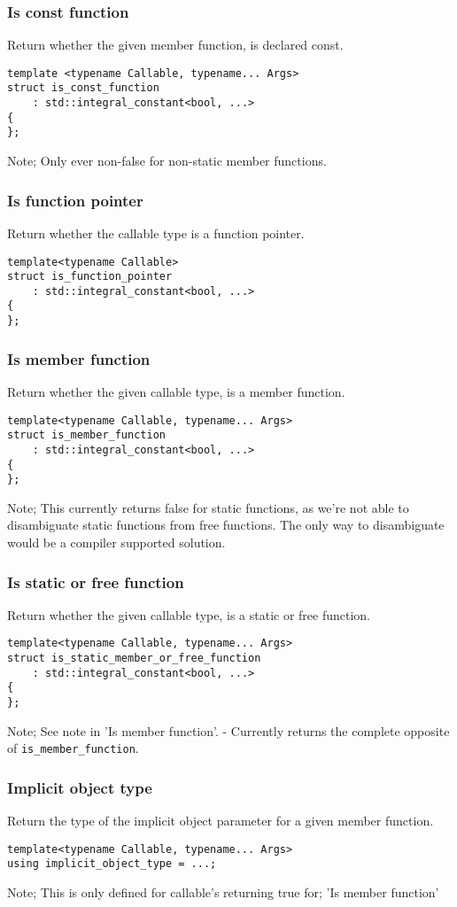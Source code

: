 \subsubsection{Is const function}
Return whether the given member function, is declared const.
\begin{verbatim}
template <typename Callable, typename... Args>
struct is_const_function
    : std::integral_constant<bool, ...>
{
};
\end{verbatim}
Note; Only ever non-false for non-static member functions.

\subsubsection{Is function pointer}
Return whether the callable type is a function pointer.
\begin{verbatim}
template<typename Callable>
struct is_function_pointer
    : std::integral_constant<bool, ...>
{
};
\end{verbatim}

\subsubsection{Is member function}
Return whether the given callable type, is a member function.
\begin{verbatim}
template<typename Callable, typename... Args>
struct is_member_function
    : std::integral_constant<bool, ...>
{
};
\end{verbatim}
Note; This currently returns false for static functions, as we're not able to
disambiguate static functions from free functions.
The only way to disambiguate would be a compiler supported solution.

\subsubsection{Is static or free function}
Return whether the given callable type, is a static or free function.
\begin{verbatim}
template<typename Callable, typename... Args>
struct is_static_member_or_free_function
    : std::integral_constant<bool, ...>
{
};
\end{verbatim}
Note; See note in 'Is member function'. - Currently returns the complete
opposite of \verb|is_member_function|.

\subsubsection{Implicit object type}
Return the type of the implicit object parameter for a given member function.
\begin{verbatim}
template<typename Callable, typename... Args>
using implicit_object_type = ...;
\end{verbatim}
Note; This is only defined for callable's returning true for;
'Is member function'

